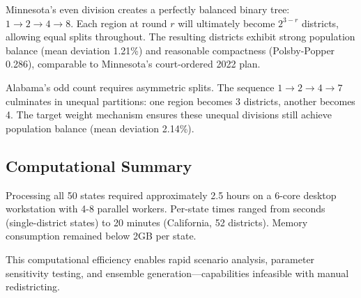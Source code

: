 Minnesota's even division creates a perfectly balanced binary tree: $1 \to 2 \to 4 \to 8$. Each region at round $r$ will ultimately become $2^{3-r}$ districts, allowing equal splits throughout. The resulting districts exhibit strong population balance (mean deviation 1.21\%) and reasonable compactness (Polsby-Popper 0.286), comparable to Minnesota's court-ordered 2022 plan.

Alabama's odd count requires asymmetric splits. The sequence $1 \to 2 \to 4 \to 7$ culminates in unequal partitions: one region becomes 3 districts, another becomes 4. The target weight mechanism ensures these unequal divisions still achieve population balance (mean deviation 2.14\%).

\subsection{Computational Summary}

Processing all 50 states required approximately 2.5 hours on a 6-core desktop workstation with 4-8 parallel workers. Per-state times ranged from seconds (single-district states) to 20 minutes (California, 52 districts). Memory consumption remained below 2GB per state.

This computational efficiency enables rapid scenario analysis, parameter sensitivity testing, and ensemble generation—capabilities infeasible with manual redistricting.


